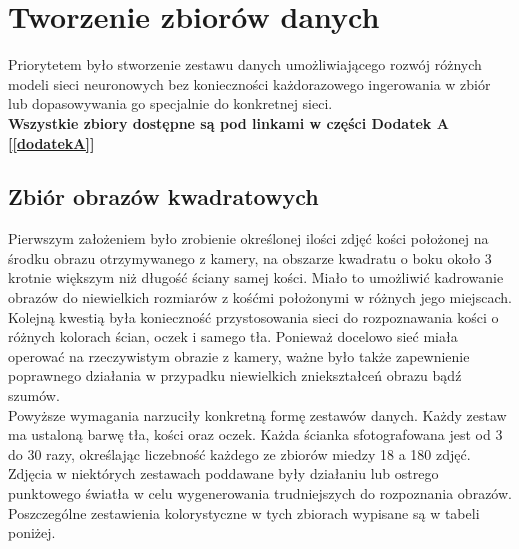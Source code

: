 
\chapter{Tworzenie zbiorów danych}
Priorytetem było stworzenie zestawu danych
umożliwiającego rozwój różnych modeli sieci neuronowych bez konieczności każdorazowego
ingerowania w zbiór lub dopasowywania go specjalnie do konkretnej sieci.\\
\textbf{Wszystkie zbiory dostępne są pod linkami w części Dodatek A [\ref{dodatekA}] }

\section{Zbiór obrazów kwadratowych}
Pierwszym założeniem było zrobienie określonej ilości zdjęć kości położonej na środku
obrazu otrzymywanego z kamery, na obszarze kwadratu o boku około 3 krotnie większym
niż długość ściany samej kości. Miało to umożliwić kadrowanie obrazów
do niewielkich rozmiarów z kośćmi położonymi w różnych jego miejscach.\\
Kolejną kwestią była konieczność przystosowania sieci do rozpoznawania kości o
różnych kolorach ścian, oczek i samego tła. Ponieważ docelowo sieć
miała operować na rzeczywistym obrazie z kamery, ważne było także zapewnienie poprawnego
działania w przypadku niewielkich zniekształceń obrazu bądź szumów.\\
Powyższe wymagania narzuciły konkretną formę zestawów danych.
Każdy zestaw ma ustaloną barwę tła, kości oraz oczek. Każda ścianka sfotografowana jest
od 3 do 30 razy, określając liczebność każdego ze zbiorów miedzy 18 a 180 zdjęć.
Zdjęcia w niektórych zestawach poddawane były działaniu lub ostrego punktowego światła
w celu wygenerowania trudniejszych do rozpoznania obrazów. Poszczególne zestawienia
kolorystyczne w tych zbiorach wypisane są w tabeli poniżej. \newpage

